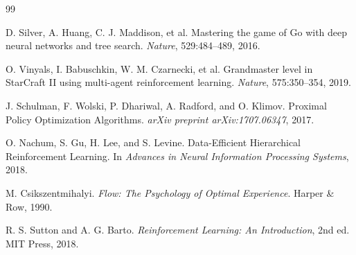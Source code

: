 \documentclass[UTF8,a4paper,11pt]{ctexart}
\begin{document}
\begin{thebibliography}{99}

D. Silver, A. Huang, C. J. Maddison, et al.
\newblock Mastering the game of Go with deep neural networks and tree search.
\newblock \emph{Nature}, 529:484--489, 2016.

O. Vinyals, I. Babuschkin, W. M. Czarnecki, et al.
\newblock Grandmaster level in StarCraft II using multi-agent reinforcement learning.
\newblock \emph{Nature}, 575:350--354, 2019.

J. Schulman, F. Wolski, P. Dhariwal, A. Radford, and O. Klimov.
\newblock Proximal Policy Optimization Algorithms.
\newblock \emph{arXiv preprint arXiv:1707.06347}, 2017.

O. Nachum, S. Gu, H. Lee, and S. Levine.
\newblock Data-Efficient Hierarchical Reinforcement Learning.
\newblock In \emph{Advances in Neural Information Processing Systems}, 2018.

M. Csikszentmihalyi.
\newblock \emph{Flow: The Psychology of Optimal Experience}.
\newblock Harper \& Row, 1990.

R. S. Sutton and A. G. Barto.
\newblock \emph{Reinforcement Learning: An Introduction}, 2nd ed.
\newblock MIT Press, 2018.

\end{thebibliography}
\end{document}
